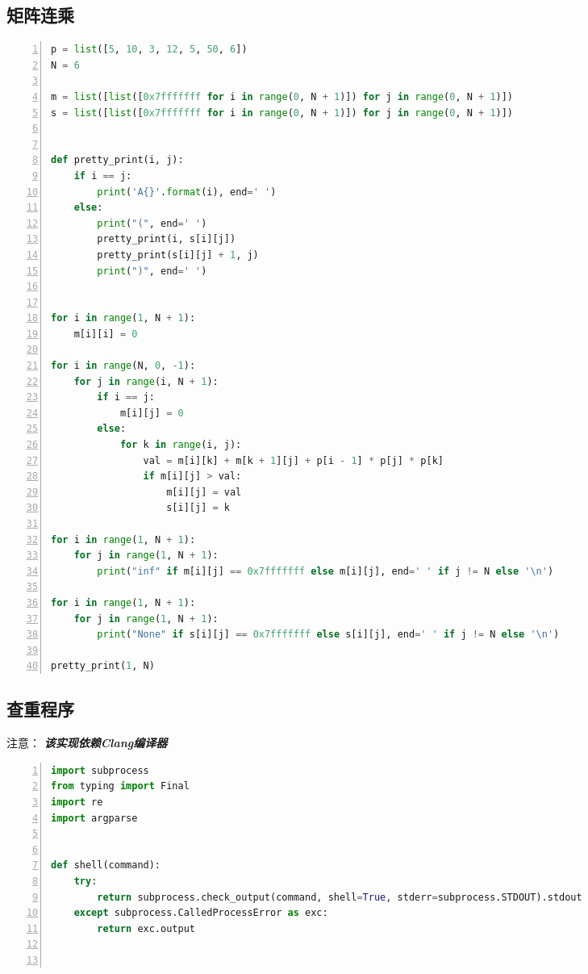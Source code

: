 \documentclass[a4paper,twoside]{article}
\begin{document}
\begin{spacing}{1.2}
\subsection{矩阵连乘}
\begin{lstlisting}[language=Python,numbers=left,style=PythonStyle,caption=矩阵连乘,label={code:implmat}]
p = list([5, 10, 3, 12, 5, 50, 6])
N = 6

m = list([list([0x7fffffff for i in range(0, N + 1)]) for j in range(0, N + 1)])
s = list([list([0x7fffffff for i in range(0, N + 1)]) for j in range(0, N + 1)])


def pretty_print(i, j):
    if i == j:
        print('A{}'.format(i), end=' ')
    else:
        print("(", end=' ')
        pretty_print(i, s[i][j])
        pretty_print(s[i][j] + 1, j)
        print(")", end=' ')


for i in range(1, N + 1):
    m[i][i] = 0

for i in range(N, 0, -1):
    for j in range(i, N + 1):
        if i == j:
            m[i][j] = 0
        else:
            for k in range(i, j):
                val = m[i][k] + m[k + 1][j] + p[i - 1] * p[j] * p[k]
                if m[i][j] > val:
                    m[i][j] = val
                    s[i][j] = k

for i in range(1, N + 1):
    for j in range(1, N + 1):
        print("inf" if m[i][j] == 0x7fffffff else m[i][j], end=' ' if j != N else '\n')

for i in range(1, N + 1):
    for j in range(1, N + 1):
        print("None" if s[i][j] == 0x7fffffff else s[i][j], end=' ' if j != N else '\n')

pretty_print(1, N)

\end{lstlisting}

\clearpage

\subsection{查重程序}

注意： \emph{\textbf{该实现依赖Clang编译器}}

\begin{lstlisting}[language=Python,numbers=left,style=PythonStyle,caption=查重程序,label={code:dupcheckfull}]
import subprocess
from typing import Final
import re
import argparse


def shell(command):
    try:
        return subprocess.check_output(command, shell=True, stderr=subprocess.STDOUT).stdout
    except subprocess.CalledProcessError as exc:
        return exc.output



\end{lstlisting}
\end{spacing}
\end{document}
